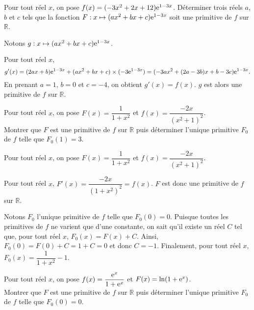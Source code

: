 \documentclass[11pt,fleqn, openany]{book} %
\begin{document}
  


\begin{exercise}[topic=diff02]Pour tout réel $x$, on pose $f(x)=(-3x^2+2x+12)\mathrm{e}^{1-3x}$. Déterminer trois réels $a$, $b$ et $c$ tels que la fonction $F : x\mapsto (ax^2+bx+c)\mathrm{e}^{1-3x}$ soit une primitive de $f$ sur $\mathbb{R}$.\end{exercise}


\begin{solution}

Notons \(g:x\mapsto (ax^2+bx+c)\mathrm{e}^{1-3x}\). 

Pour tout réel \(x\), 
\[g'(x)=(2ax+b)\mathrm{e}^{1-3x}+(ax^2+bx+c)\times (-3\mathrm{e}^{1-3x})=(-3ax^2+(2a-3b)x+b-3c)\mathrm{e}^{1-3x}.\]
En prenant \(a=1\), \(b=0\) et \(c=-4\), on obtient \(g'(x)=f(x)\). \(g\) est alors une primitive de \(f\) sur \(\mathbb{R}\).

 \end{solution}
 
 


\begin{exercise}[topic=diff02]Pour tout réel $x$, on pose $F(x)=\dfrac{1}{1+x^2}$ et $f(x)=\dfrac{-2x}{(x^2+1)^2}$. \\
Montrer que $F$ est une primitive de $f$ sur $\mathbb{R}$ puis déterminer l'unique primitive $F_0$ de $f$ telle que $F_0(1)=3$.\end{exercise}

\begin{solution}

Pour tout réel \(x\), on pose \(F(x)=\dfrac{1}{1+x^2}\) et \(f(x)=\dfrac{-2x}{(x^2+1)^2}\). 

Pour tout réel \(x\), \(F'(x)=\dfrac{-2x}{(1+x^2)^2}=f(x)\). \(F\) est donc une primitive de \(f\) sur \(\mathbb{R}\).

Notons \(F_0\) l'unique primitive de \(f\) telle que \(F_0(0)=0\). Puisque toutes les primitives de \(f\) ne varient que d'une constante, on sait qu'il existe un réel \(C\) tel que, pour tout réel \(x\), \(F_0(x)=F(x)+C\).
Ainsi, \(F_0(0)=F(0)+C=1+C=0\) et donc \(C=-1\). Finalement, pour tout réel \(x\), \(F_0(x)=\dfrac{1}{1+x^2}-1\).

\end{solution}




\begin{exercise}[topic=diff02]Pour tout réel $x$, on pose $f(x)=\dfrac{\mathrm{e}^x}{1+\mathrm{e}^x}$ et $F(x)=\ln(1+\mathrm{e}^x)$.\\
 Montrer que $F$ est une primitive de $f$ sur $\mathbb{R}$ puis déterminer l'unique primitive $F_0$ de $f$ telle que $F_0(0)=0$.
\end{exercise}
\end{document}
